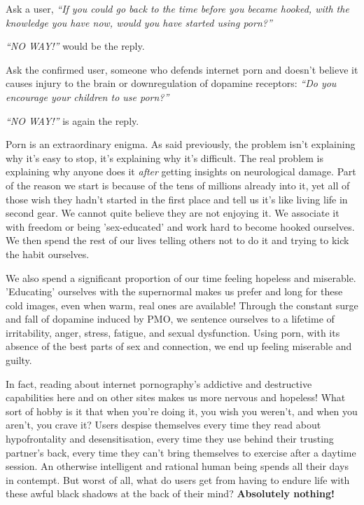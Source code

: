 \documentclass[
]{book}
\begin{document}
Ask a user, \emph{``If you could go back to the time before you became hooked, with the knowledge you have now, would you have started using porn?''}

\emph{``NO WAY!''} would be the reply.

Ask the confirmed user, someone who defends internet porn and doesn't believe it causes injury to the brain or downregulation of dopamine receptors: \emph{``Do you encourage your children to use porn?''}

\emph{``NO WAY!''} is again the reply.

Porn is an extraordinary enigma. As said previously, the problem isn't explaining why it's easy to stop, it's explaining why it's difficult. The real problem is explaining why anyone does it \emph{after} getting insights on neurological damage. Part of the reason we start is because of the tens of millions already into it, yet all of those wish they hadn't started in the first place and tell us it's like living life in second gear. We cannot quite believe they are not enjoying it. We associate it with freedom or being 'sex-educated' and work hard to become hooked ourselves. We then spend the rest of our lives telling others not to do it and trying to kick the habit ourselves.

We also spend a significant proportion of our time feeling hopeless and miserable. 'Educating' ourselves with the supernormal makes us prefer and long for these cold images, even when warm, real ones are available! Through the constant surge and fall of dopamine induced by PMO, we sentence ourselves to a lifetime of irritability, anger, stress, fatigue, and sexual dysfunction. Using porn, with its absence of the best parts of sex and connection, we end up feeling miserable and guilty.

In fact, reading about internet pornography's addictive and destructive capabilities here and on other sites makes us more nervous and hopeless! What sort of hobby is it that when you're doing it, you wish you weren't, and when you aren't, you crave it? Users despise themselves every time they read about hypofrontality and desensitisation, every time they use behind their trusting partner's back, every time they can't bring themselves to exercise after a daytime session. An otherwise intelligent and rational human being spends all their days in contempt. But worst of all, what do users get from having to endure life with these awful black shadows at the back of their mind? \textbf{Absolutely nothing!}
\end{document}
